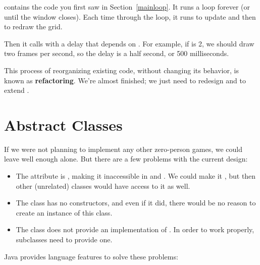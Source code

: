  contains the code you first saw in Section~\ref{mainloop}.
It runs a  loop forever (or until the window closes).
Each time through the loop, it runs  to update  and then  to redraw the grid.

Then it calls  with a delay that depends on .
For example, if  is 2, we should draw two frames per second, so the delay is a half second, or 500 milliseconds.


This process of reorganizing existing code, without changing its behavior, is known as {\bf refactoring}.
We're almost finished; we just need to redesign  and  to extend .


\section{Abstract Classes}
\label{reusing-classes_abstract-classes}

If we were not planning to implement any other zero-person games, we could leave well enough alone.
But there are a few problems with the current design:

\begin{itemize}

\item The  attribute is , making it inaccessible in  and .
We could make it , but then other (unrelated) classes would have access to it as well.

\item The  class has no constructors, and even if it did, there would be no reason to create an instance of this class.

\item The  class does not provide an implementation of .
In order to work properly, subclasses need to provide one.

\end{itemize}


Java provides language features to solve these problems:

